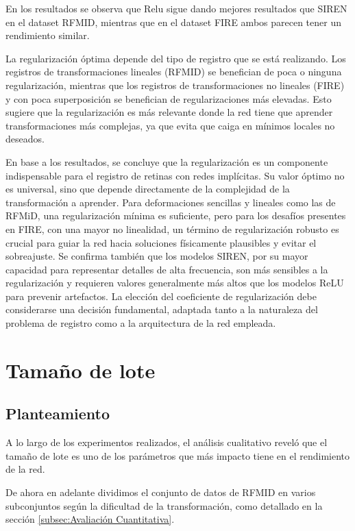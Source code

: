 En los resultados se observa que Relu sigue dando mejores resultados que SIREN en el dataset RFMID, mientras que en el dataset FIRE ambos parecen tener un rendimiento similar.

La regularización óptima depende del tipo de registro que se está realizando. Los registros de transformaciones lineales (RFMID) se benefician de poca o ninguna regularización, mientras que los registros de transformaciones no lineales (FIRE) y con poca superposición se benefician de regularizaciones más elevadas.
Esto sugiere que la regularización es más relevante donde la red tiene que aprender transformaciones más complejas, ya que evita que caiga en mínimos locales no deseados.%

En base a los resultados, se concluye que la regularización es un componente indispensable para el registro de retinas con redes implícitas. Su valor óptimo no es universal, sino que depende directamente de la complejidad de la transformación a aprender. Para deformaciones sencillas y lineales como las de RFMiD, una regularización mínima es suficiente, pero para los desafíos presentes en FIRE, con una mayor no linealidad, un término de regularización robusto es crucial para guiar la red hacia soluciones físicamente plausibles y evitar el sobreajuste. Se confirma también que los modelos SIREN, por su mayor capacidad para representar detalles de alta frecuencia, son más sensibles a la regularización y requieren valores generalmente más altos que los modelos ReLU para prevenir artefactos. La elección del coeficiente de regularización debe considerarse una decisión fundamental, adaptada tanto a la naturaleza del problema de registro como a la arquitectura de la red empleada.

\section{Tamaño de lote}
\label{sec:Tamaño de lote}

\subsection{Planteamiento}
\label{subsec:Planteamento-batchsize}

A lo largo de los experimentos realizados, el análisis cualitativo reveló que el tamaño de lote es uno de los parámetros que más impacto tiene en el rendimiento de la red.

De ahora en adelante dividimos el conjunto de datos de RFMID en varios subconjuntos según la dificultad de la transformación, como detallado en la sección \ref{subsec:Avaliación Cuantitativa}.

